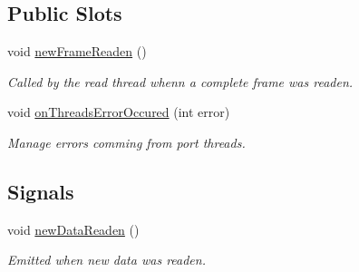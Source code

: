 \subsection*{Public Slots}
\begin{DoxyCompactItemize}
\item 
void \hyperlink{classmdt_port_manager_a4a2a146021158aeb72f9f4b6d62b6dd0}{newFrameReaden} ()
\begin{DoxyCompactList}\small\item\em Called by the read thread whenn a complete frame was readen. \end{DoxyCompactList}\item 
\hypertarget{classmdt_port_manager_a7e45b8e3475e5182ed12218616664d07}{
void \hyperlink{classmdt_port_manager_a7e45b8e3475e5182ed12218616664d07}{onThreadsErrorOccured} (int error)}
\label{classmdt_port_manager_a7e45b8e3475e5182ed12218616664d07}

\begin{DoxyCompactList}\small\item\em Manage errors comming from port threads. \end{DoxyCompactList}\end{DoxyCompactItemize}
\subsection*{Signals}
\begin{DoxyCompactItemize}
\item 
void \hyperlink{classmdt_port_manager_a000ffb4df553fad9ec90e62caaccc91f}{newDataReaden} ()
\begin{DoxyCompactList}\small\item\em Emitted when new data was readen. \end{DoxyCompactList}\end{DoxyCompactItemize}
